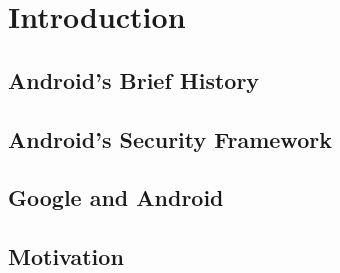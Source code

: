 \chapter{Introduction}

\section{Android's Brief History}

\section{Android's Security Framework}

\section{Google and Android}

\section{Motivation}
